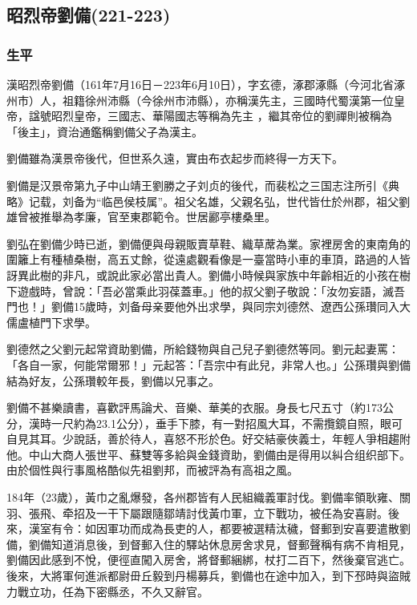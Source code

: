
\subsection{昭烈帝劉備\tiny(221-223)}

\subsubsection{生平}

漢昭烈帝劉備（161年7月16日－223年6月10日），字玄德，涿郡涿縣（今河北省涿州市）人，祖籍徐州沛縣（今徐州市沛縣），亦稱漢先主，三國時代蜀漢第一位皇帝，諡號昭烈皇帝，三國志、華陽國志等稱為先主 ，繼其帝位的劉禪則被稱為「後主」，資治通鑑稱劉備父子為漢主。

劉備雖為漢景帝後代，但世系久遠，實由布衣起步而終得一方天下。

劉備是汉景帝第九子中山靖王劉勝之子刘贞的後代，而裴松之三国志注所引《典略》记载，刘备为“临邑侯枝属”。祖父名雄，父親名弘，世代皆仕於州郡，祖父劉雄曾被推舉為孝廉，官至東郡範令。世居酈亭樓桑里。

劉弘在劉備少時已逝，劉備便與母親販賣草鞋、織草蓆為業。家裡房舍的東南角的圍籬上有種植桑樹，高五丈餘，從遠處觀看像是一臺當時小車的車頂，路過的人皆訝異此樹的非凡，或說此家必當出貴人。劉備小時候與家族中年齡相近的小孩在樹下遊戲時，曾說：「吾必當乘此羽葆蓋車。」他的叔父劉子敬說：「汝勿妄語，滅吾門也！」劉備15歲時，刘备母亲要他外出求學，與同宗刘德然、遼西公孫瓚同入大儒盧植門下求學。

劉德然之父劉元起常資助劉備，所給錢物與自己兒子劉德然等同。劉元起妻罵：「各自一家，何能常爾邪！」元起答：「吾宗中有此兒，非常人也。」公孫瓚與劉備結為好友，公孫瓚較年長，劉備以兄事之。

劉備不甚樂讀書，喜歡評馬論犬、音樂、華美的衣服。身長七尺五寸（約173公分，漢時一尺約為23.1公分），垂手下膝，有一對招風大耳，不需攬鏡自照，眼可自見其耳。少說話，善於待人，喜怒不形於色。好交結豪俠義士，年輕人爭相趨附他。中山大商人張世平、蘇雙等多給與金錢資助，劉備由是得用以糾合组织部下。由於個性與行事風格酷似先祖劉邦，而被評為有高祖之風。

184年（23歲），黃巾之亂爆發，各州郡皆有人民組織義軍討伐。劉備率領耿雍、關羽、張飛、牵招及一干下屬跟隨鄒靖討伐黃巾軍，立下戰功，被任為安喜尉。後來，漢室有令：如因軍功而成為長吏的人，都要被選精汰穢，督郵到安喜要遣散劉備，劉備知道消息後，到督郵入住的驛站休息房舍求見，督郵聲稱有病不肯相見，劉備因此感到不悅，便徑直闖入房舍，將督郵綑綁，杖打二百下，然後棄官逃亡。後來，大將軍何進派都尉毌丘毅到丹楊募兵，劉備也在途中加入，到下邳時與盜賊力戰立功，任為下密縣丞，不久又辭官。

